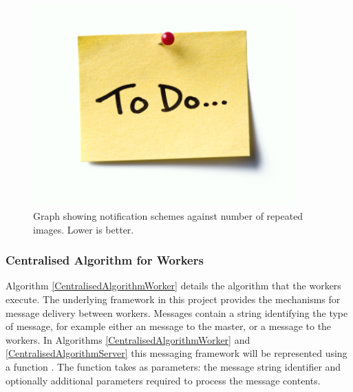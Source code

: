 \documentclass[12pt]{article}
\begin{document}
\begin{figure}[H]
  \centering
  \includegraphics[width=4in]{todo}
  \caption[]{Graph showing notification schemes against number of repeated images. Lower is better.}
  \label{EventProcessingPerformance}
\end{figure}

\subsubsection{Centralised Algorithm for Workers}

Algorithm \ref{CentralisedAlgorithmWorker} details the algorithm that the workers execute. The underlying framework in this project provides the mechanisms for message delivery between workers. Messages contain a string identifying the type of message, for example either an  message to the master, or a  message to the workers.
\newline
In Algorithms \ref{CentralisedAlgorithmWorker} and \ref{CentralisedAlgorithmServer} this messaging framework will be represented using a function . The  function takes as parameters: the message string identifier and optionally additional parameters required to process the message contents.
\end{document}
